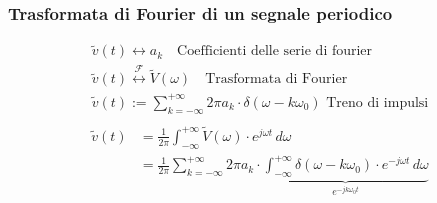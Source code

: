 \documentclass[a4paper]{article}
\begin{document}
\subsubsection{Trasformata di Fourier di un segnale periodico}
\[
  \begin{aligned}
    \tilde{v}(t) \leftrightarrow a_k \quad \text{Coefficienti delle serie di fourier}\\
    \tilde{v}(t) \stackrel{\mathcal{F}}{\leftrightarrow} \tilde{V}(\omega) \quad \text{Trasformata di Fourier}\\
    \tilde{v}(t) := \sum_{k=-\infty}^{+\infty} 2 \pi a_k \cdot \delta(\omega - k \omega_0) \text{ Treno di impulsi}\\
  \end{aligned}
\] 
\[
  \begin{aligned}
    \tilde{v}(t) &= \frac{1}{2 \pi } \int_{-\infty}^{+\infty} \tilde{V}(\omega) \cdot e^{j \omega t} \, d\omega\\
                 &= \frac{1}{2 \pi } \sum_{k=-\infty}^{+\infty} 2 \pi a_k \cdot
                 \underbrace{\int_{-\infty}^{+\infty} \delta(\omega - k \omega_0) \cdot e^{-j \omega t} \, d\omega}_{e^{-j k \omega_0 t}}
  \end{aligned}
\] 
\end{document}
